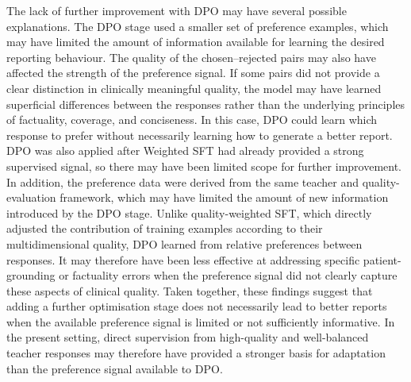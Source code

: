 \documentclass[ %
                    author={Aman Kumar Singh},
                supervisor={Dr. Edwin Simpson},
                    degree={MSc},
                     title={Quality-Aware Knowledge Distillation of Large Language Models for Efficient Personalised Clinical Report Generation},
                  subtitle={},
                      type={},
                      year={2021}]{dissertation}
\begin{document}
The lack of further improvement with DPO may have several possible
explanations. The DPO stage used a smaller set of preference examples, which
may have limited the amount of information available for learning the desired
reporting behaviour. The quality of the chosen--rejected pairs may also have
affected the strength of the preference signal. If some pairs did not provide
a clear distinction in clinically meaningful quality, the model may have
learned superficial differences between the responses rather than the
underlying principles of factuality, coverage, and conciseness. In this case,
DPO could learn which response to prefer without necessarily learning how to
generate a better report. DPO was also applied after Weighted SFT had already
provided a strong supervised signal, so there may have been limited scope for
further improvement. In addition, the preference data were derived from the
same teacher and quality-evaluation framework, which may have limited the
amount of new information introduced by the DPO stage. Unlike quality-weighted
SFT, which directly adjusted the contribution of training examples according
to their multidimensional quality, DPO learned from relative preferences
between responses. It may therefore have been less effective at addressing
specific patient-grounding or factuality errors when the preference signal
did not clearly capture these aspects of clinical quality. Taken together,
these findings suggest that adding a further optimisation stage does not
necessarily lead to better reports when the available preference signal is
limited or not sufficiently informative. In the present setting, direct
supervision from high-quality and well-balanced teacher responses may
therefore have provided a stronger basis for adaptation than the preference
signal available to DPO.
\end{document}
